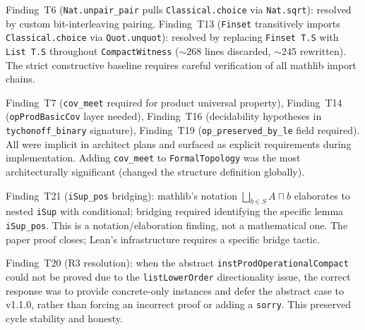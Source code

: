 \begin{remark}
\label{rem:T_pattern2}
\leanok
{}
Finding~T6 (\texttt{Nat.unpair\_pair} pulls \texttt{Classical.choice}
via \texttt{Nat.sqrt}): resolved by custom bit-interleaving pairing.
Finding~T13 (\texttt{Finset} transitively imports
\texttt{Classical.choice} via \texttt{Quot.unquot}): resolved by
replacing \texttt{Finset T.S} with \texttt{List T.S} throughout
\texttt{CompactWitness} (${\sim}268$ lines discarded, ${\sim}245$
rewritten).  The strict constructive baseline requires careful
verification of all mathlib import chains.
\end{remark}

\begin{remark}
\label{rem:T_pattern3}
\leanok
{}
Finding~T7 (\texttt{cov\_meet} required for product universal property),
Finding~T14 (\texttt{opProdBasicCov} layer needed),
Finding~T16 (decidability hypotheses in \texttt{tychonoff\_binary}
signature), Finding~T19 (\texttt{op\_preserved\_by\_le} field required).
All were implicit in architect plans and surfaced as explicit requirements
during implementation.  Adding \texttt{cov\_meet} to \texttt{FormalTopology}
was the most architecturally significant (changed the structure definition
globally).
\end{remark}

\begin{remark}
\label{rem:T_pattern4}
\leanok
{}
Finding~T21 (\texttt{iSup\_pos} bridging): mathlib's notation
$\bigsqcup_{b \in S} A \sqcap b$ elaborates to nested \texttt{iSup}
with conditional; bridging required identifying the specific lemma
\texttt{iSup\_pos}.  This is a notation/elaboration finding, not
a mathematical one.  The paper proof closes; Lean's infrastructure
requires a specific bridge tactic.
\end{remark}

\begin{remark}
\label{rem:T_pattern5}
\leanok
{}
Finding~T20 (R3 resolution): when the abstract
\texttt{instProdOperationalCompact} could not be proved due to the
\texttt{listLowerOrder} directionality issue, the correct response was
to provide concrete-only instances and defer the abstract case to
v1.1.0, rather than forcing an incorrect proof or adding a
\texttt{sorry}.  This preserved cycle stability and honesty.
\end{remark}


